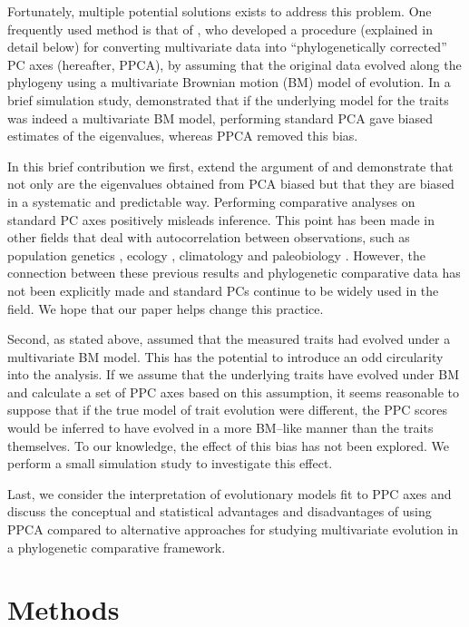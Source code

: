 \documentclass[a4paper,12pt]{article}
\begin{document}
Fortunately, multiple potential solutions exists to address this problem.  One frequently used method is that of \citet{Revell2008}, who developed a procedure (explained in detail below) for converting multivariate data into ``phylogenetically corrected'' PC axes (hereafter, PPCA), by assuming that the original data evolved along the phylogeny using a multivariate Brownian motion (BM) model of evolution. In a brief simulation study, \citet{Revell2008} demonstrated that if the underlying model for the traits was indeed a multivariate BM model, performing standard PCA gave biased estimates of the eigenvalues, whereas PPCA removed this bias.

In this brief contribution we first, extend the argument of \citet{Revell2008} and demonstrate that not only are the eigenvalues obtained from PCA biased but that they are biased in a systematic and predictable way. Performing comparative analyses on standard PC axes positively misleads inference. This point has been made in other fields that deal with autocorrelation between observations, such as population genetics \citep{Novembre}, ecology \citep{Podani2002}, climatology \citep{Richman1986} and paleobiology \citep{Bookstein2012}. However, the connection between these previous results and phylogenetic comparative data has not been explicitly made and standard PCs continue to be widely used in the field. We hope that our paper helps change this practice.

Second, as stated above, \citet{Revell2008} assumed that the measured traits had evolved under a multivariate BM model. This has the potential to introduce an odd circularity into the analysis. If we assume that the underlying traits have evolved under BM and calculate a set of PPC axes based on this assumption, it seems reasonable to suppose that if the true model of trait evolution were different, the PPC scores would be inferred to have evolved in a more BM--like manner than the traits themselves. To our knowledge, the effect of this bias has not been explored. We perform a small simulation study to investigate this effect.

Last, we consider the interpretation of evolutionary models fit to PPC axes and discuss the conceptual and statistical advantages and disadvantages of using PPCA compared to alternative approaches for studying multivariate evolution in a phylogenetic comparative framework.

\section{Methods}
\end{document}
